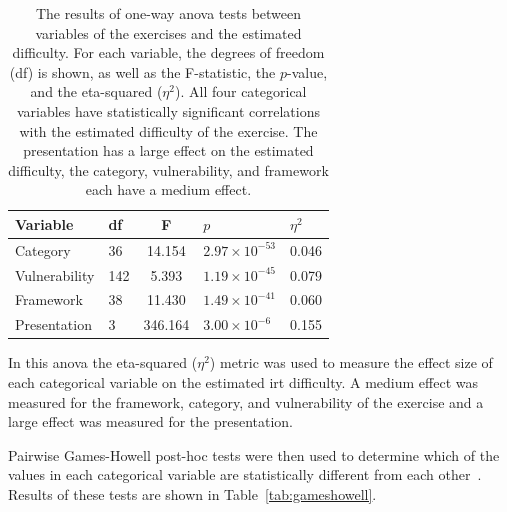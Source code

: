 \begin{table}
    \centering
    \caption[\Gls{anova} test results for Rasch model]{The results of one-way \gls{anova} tests between variables of the exercises and the estimated difficulty. For each variable, the degrees of freedom (df) is shown, as well as the F-statistic, the $p$-value, and the eta-squared ($\eta^2$). All four categorical variables have statistically significant correlations with the estimated difficulty of the exercise. The presentation has a large effect on the estimated difficulty, the category, vulnerability, and framework each have a medium effect.}
    \setcellgapes{4pt}\makegapedcells
    \begin{tabular}{l l S[table-format=3.3] l l}
    Variable & df & F & $p$ & $\eta^2$ \\
    \hline
    Category & 36 & 14.154 & $2.97 \times 10^{-53}$ & 0.046 \\
    Vulnerability & 142 & 5.393 & $1.19 \times 10^{-45}$ & 0.079 \\
    Framework & 38 & 11.430 & $ 1.49 \times 10^{-41}$ & 0.060 \\
    Presentation & 3 & 346.164 & $3.00 \times 10^{-6}$ & 0.155 \\
    \end{tabular}
    \label{tab:anova1}
\end{table}

In this \gls{anova} the eta-squared ($\eta^2$) metric was used to measure the effect size of each categorical variable on the estimated \gls{irt} difficulty.
A medium effect was measured for the framework, category, and vulnerability of the exercise and a large effect was measured for the presentation.

Pairwise Games-Howell post-hoc tests were then used to determine which of the values in each categorical variable are statistically different from each other~\cite{games1976pairwise}.
Results of these tests are shown in Table~\ref{tab:gameshowell}.

